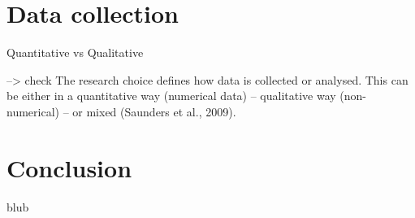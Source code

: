 
\section{Data collection}

Quantitative vs Qualitative

--> check The research choice defines how data is collected or analysed. This can be either in a quantitative way (numerical data) – qualitative way (non-numerical) – or mixed (Saunders et al., 2009).





\section{Conclusion}

blub

